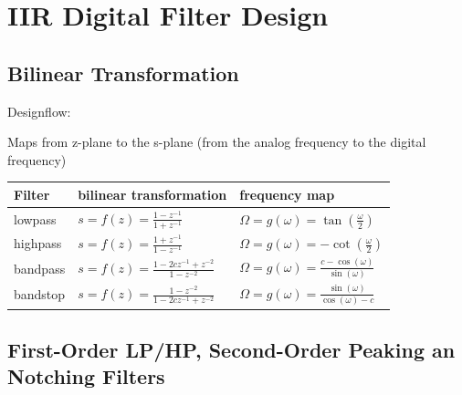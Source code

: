 \section{IIR Digital Filter Design}
\subsection{Bilinear Transformation}
Designflow:
\begin{center}

\end{center}
Maps from z-plane to the s-plane (from the analog frequency to the digital
frequency)

\begin{tabularx}{0.8\textwidth}{|l|X|X|}
	\hline
	\textbf{Filter} & \textbf{bilinear transformation} & \textbf{frequency map}
	\\ \hline
	lowpass & 
	$s = f(z) = \frac{1 - z^{-1}}{1 + z^{-1}}$ &
	$ \Omega = g(\omega) = \tan(\frac{\omega}{2})$
	\\ \hline
	highpass & 
	$s = f(z) = \frac{1 + z^{-1}}{1 - z^{-1}}$ &
	$ \Omega = g(\omega) = - \cot(\frac{\omega}{2})$
	\\ \hline
	bandpass & 
	$s = f(z) = \frac{1 - 2cz^{-1} +z^{-2}}{1 - z^{-2}}$ &
	$ \Omega = g(\omega) = \frac{c - \cos(\omega)}{\sin(\omega)}$
	\\ \hline
	bandstop & 
	$s = f(z) = \frac{1 - z^{-2}}{1 - 2cz^{-1} + z^{-2}}$ &
	$ \Omega = g(\omega) = \frac{\sin(\omega)}{\cos(\omega) - c}$ 
	\\ \hline
\end{tabularx}

\subsection{First-Order LP/HP, Second-Order Peaking an Notching Filters}

